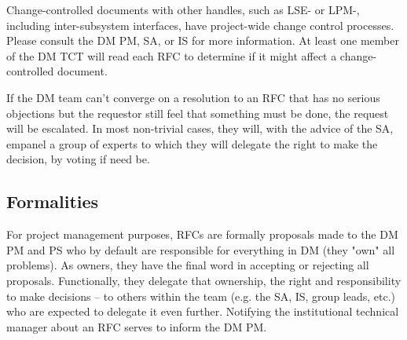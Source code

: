 Change-controlled documents with other handles, such as LSE- or LPM-, including inter-subsystem interfaces, have project-wide change control processes. Please consult the DM PM, SA, or IS for more information.
At least one member of the DM TCT will read each RFC to determine if it might affect a change-controlled document.

If the DM team can't converge on a resolution to an RFC that has no serious objections but the requestor still feel that something must be done, the request will be escalated. In most non-trivial cases, they will, with the advice of the SA, empanel a group of experts to which they will delegate the right to make the decision, by voting if need be.

\subsection{Formalities}
For project management purposes, RFCs are formally proposals made to the DM PM and PS who by default are responsible for everything in DM (they "own" all problems). As owners, they have the final word in accepting or rejecting all proposals. Functionally, they delegate that ownership, the right and responsibility to make decisions -- to others within the team (e.g. the SA, IS, group leads, etc.) who are expected to delegate it even further. Notifying the institutional technical manager about an RFC serves to inform the DM PM.

